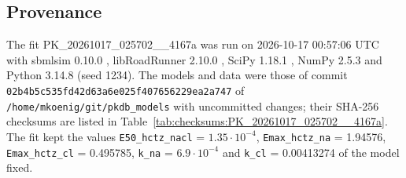\subsection{Provenance}

The fit PK\_20261017\_025702\_\_4167a was run on 2026-10-17 00:57:06 UTC with sbmlsim 0.10.0 \cite{Koenig2026_sbmlsim}, libRoadRunner 2.10.0 \cite{Welsh2023}, SciPy 1.18.1 \cite{Virtanen2020}, NumPy 2.5.3 \cite{Harris2020} and Python 3.14.8 (seed 1234). The models and data were those of commit \texttt{02b4b5c535fd42d63a6e025f407656229ea2a747} of \texttt{/home/mkoenig/git/pkdb\_models} with uncommitted changes; their SHA-256 checksums are listed in Table~\ref{tab:checksums:PK_20261017_025702__4167a}. The fit kept the values \texttt{E50\_hctz\_nacl} = $1.35 \cdot 10^{-4}$, \texttt{Emax\_hctz\_na} = 1.94576, \texttt{Emax\_hctz\_cl} = 0.495785, \texttt{k\_na} = $6.9 \cdot 10^{-4}$ and \texttt{k\_cl} = 0.00413274 of the model fixed.

